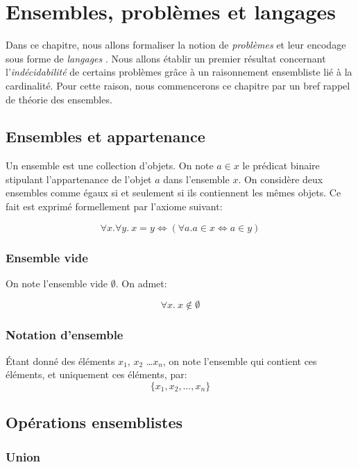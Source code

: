 \chapter{Ensembles, problèmes et langages}

Dans ce chapitre, nous allons formaliser la notion de \og \textit{problèmes} \fg{} et leur encodage sous forme de \og \textit{langages} \fg{}.
Nous allons établir un premier résultat concernant l'\og \textit{indécidabilité} \fg{} de certains problèmes grâce à un raisonnement ensembliste lié à la cardinalité.
Pour cette raison, nous commencerons ce chapitre par un bref rappel de théorie des ensembles.

\section{Ensembles et appartenance}

Un ensemble est une collection d'objets.
On note $a \in x$ le prédicat binaire stipulant l'appartenance de l'objet $a$ dans l'ensemble $x$.
On considère deux ensembles comme égaux si et seulement si ils contiennent les mêmes objets.
Ce fait est exprimé formellement par l'axiome suivant:

\[
\forall x. \forall y.\ x = y \iff (\forall a. a \in x \iff a \in y)
\]

\subsection{Ensemble vide}

On note l'ensemble vide $\emptyset$.
On admet:

\[
\forall x.\ x \not\in \emptyset
\]

\subsection{Notation d'ensemble}

Étant donné des éléments $x_1$, $x_2$ \dots $x_n$, on note l'ensemble qui contient ces éléments, et uniquement ces éléments, par:
\[
\{ x_1, x_2, \dots, x_n\}
\]

\section{Opérations ensemblistes}

\subsection{Union}


